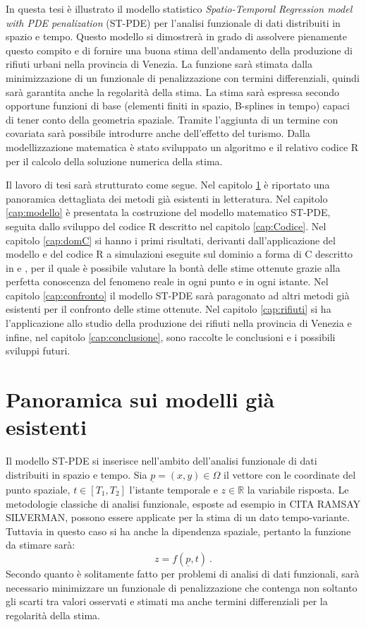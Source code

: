 \documentclass[a4paper,11pt,twoside,openright]{book}							%
\begin{document}
In questa tesi è illustrato il modello statistico \textit{Spatio-Temporal Regression model with PDE penalization} (ST-PDE) per l'analisi funzionale di dati distribuiti in spazio e tempo. Questo modello si dimostrerà in grado di assolvere pienamente questo compito e di fornire una buona stima dell'andamento della produzione di rifiuti urbani nella provincia di Venezia. La funzione sarà stimata dalla minimizzazione di un funzionale di penalizzazione con termini differenziali, quindi sarà garantita anche la regolarità della stima. La stima sarà espressa secondo opportune funzioni di base (elementi finiti in spazio, B-splines in tempo) capaci di tener conto della geometria spaziale. Tramite l'aggiunta di un termine con covariata sarà possibile introdurre anche dell'effetto del turismo. Dalla modellizzazione matematica è stato sviluppato un algoritmo e il relativo codice R per il calcolo della soluzione numerica della stima. 

Il lavoro di tesi sarà strutturato come segue. Nel capitolo \ref{cap:panoramica} è riportato una panoramica dettagliata dei metodi già esistenti in letteratura. Nel capitolo \ref{cap:modello} è presentata la costruzione del modello matematico ST-PDE, seguita dallo sviluppo del codice R descritto nel capitolo \ref{cap:Codice}. Nel capitolo \ref{cap:domC} si hanno i primi risultati, derivanti dall'applicazione del modello e del codice R a simulazioni eseguite sul dominio a forma di C descritto in \cite{art:ramsay} e \cite{art:wood}, per il quale è possibile valutare la bontà delle stime ottenute grazie alla perfetta conoscenza del fenomeno reale in ogni punto e in ogni istante. Nel capitolo \ref{cap:confronto} il modello ST-PDE sarà paragonato ad altri metodi già esistenti per il confronto delle stime ottenute. Nel capitolo \ref{cap:rifiuti} si ha l'applicazione allo studio della produzione dei rifiuti nella provincia di Venezia e infine, nel capitolo \ref{cap:conclusione}, sono raccolte le conclusioni e i possibili sviluppi futuri.
\newpage
\thispagestyle{empty}

\chapter{Panoramica sui modelli già esistenti}
\label{cap:panoramica}

Il modello ST-PDE si inserisce nell'ambito dell'analisi funzionale di dati distribuiti in spazio e tempo. Sia $\underline p = (x,y) \in \Omega$ il vettore con le coordinate del punto spaziale, $t \in [T_1,T_2]$ l'istante temporale e $z \in \mathbb{R}$ la variabile risposta. Le metodologie classiche di analisi funzionale, esposte ad esempio in CITA RAMSAY SILVERMAN, possono essere applicate per la stima di un dato tempo-variante. Tuttavia in questo caso si ha anche la dipendenza spaziale, pertanto la funzione da stimare sarà:
$$
z=f(\underline p,t) \ .
$$
Secondo quanto è solitamente fatto per problemi di analisi di dati funzionali, sarà necessario minimizzare un funzionale di penalizzazione che contenga non soltanto gli scarti tra valori osservati e stimati ma anche termini differenziali per la regolarità della stima.
\end{document}
